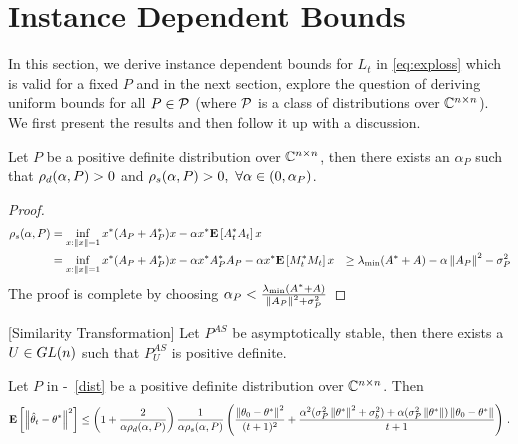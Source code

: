 \section{Instance Dependent Bounds}
In this section, we derive instance dependent bounds for $L_t$ in \eqref{eq:exploss} which is valid for a fixed $P$ and in the next section, explore the question of deriving uniform bounds for all $P\in \P$ (where $\P$ is a class of distributions over $\C^{\ncn}$). We first present the results and then follow it up with a discussion.
\begin{lemma}\label{lm:pd}
Let $P$ be a positive definite distribution over $\C^{\ncn}$, then there exists an $\alpha_P$ such that $\rhod{P}>0$ and $\rhos{P}>0,~\forall \alpha \in (0,\alpha_P)$.
\end{lemma}
\begin{proof}
\begin{align*}
\rhos{P}&=\inf_{x:\norm{x}=1}x^* (A_P+A_P^*)x -\alpha x^*\EE{A_t^* A_t} x\\
&=\inf_{x:\norm{x}=1}x^* (A_P+A_P^*)x -\alpha x^* A^*_P A_P -\alpha x^* \EE{M_t^* M_t} x
&\geq \lambda_{\min}(A^*+A)-\alpha \norm{A_P}^2-\sigma^2_P
\end{align*}
The proof is complete by choosing $\alpha_P<\frac{\lambda_{\min}(A^*+A)}{\norm{A_P}^2+\sigma^2_P}$
\end{proof}

\begin{lemma}\label{lm:simtran}[Similarity Transformation]
Let $P^{AS}$ be asymptotically stable, then there exists a $U\in \gln$ such that $P^{AS}_U$ is positive definite.
\end{lemma}

\begin{theorem}\label{th:pdrate}
Let $P$ in -~\ref{dist} be a positive definite distribution over $\C^{\ncn}$. Then
\begin{align}
\EE{\norm{\thh_t-\theta^*}^2}
\leq
\left(1+\frac2{\alpha\rhod{P}}\right)\frac{1}{\alpha \rhos{P}}
\left(\frac{\norm{\theta_0-\theta^*}^2}{(t+1)^2}+ \frac{\alpha^2(\sigma_P^2\norm{\ts}^2+\sigma_b^2)+\alpha (\sigma_P^2\norm{\ts})\norm{\theta_0-\theta^*}}{t+1} \right)\,.
\end{align}

\end{theorem}


